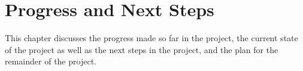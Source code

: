\chapter{Progress and Next Steps}
\label{chap:progress-and-next-steps}
This chapter discusses the progress made so far in the project, the current state of the project as well as the next steps in the project, and the plan for the remainder of the project.

\begingroup
\let\clearpage\relax





\endgroup